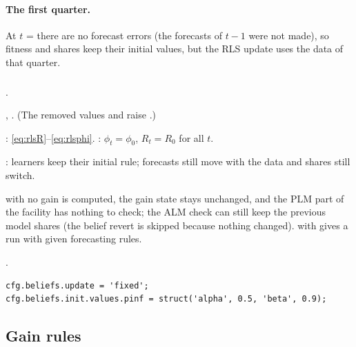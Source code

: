 \documentclass[11pt,a4paper]{article}
\DeclareRobustCommand{\codem}[1]{\texttt{\detokenize{#1}}}
\newenvironment{optspec}%
  {\begin{description}[style=sameline,leftmargin=2.7cm,labelwidth=2.5cm,font=\normalfont\itshape]}%
  {\end{description}}
\begin{document}
\paragraph{The first quarter.} At $t$ =  there are no forecast errors
(the forecasts of $t-1$ were not made), so fitness and shares keep their initial values, but the
RLS update uses the data of that quarter.

\subsubsection{\texorpdfstring{\codem{beliefs.update}}{beliefs.update}}\label{opt:beliefs-update}
\begin{optspec}
  \item[Default] .
  \item[Values] , . (The removed values  and 
        raise .)
  \item[Math] : \eqref{eq:rlsR}--\eqref{eq:rlsphi}. :
        $\phi_t = \phi_0$, $R_t = R_0$ for all $t$.
  \item[Assumptions] : learners keep their initial rule; forecasts still move with
        the data and shares still switch.
  \item[Interactions] with  no gain is computed, the gain state stays unchanged, and the
        PLM part of the facility has nothing to check; the ALM check can still keep the
        previous model shares (the belief revert is skipped because nothing changed).
         with  gives a run with given
        forecasting rules.
  \item[Code] .
  \item[Example]
\begin{lstlisting}
cfg.beliefs.update = 'fixed';
cfg.beliefs.init.values.pinf = struct('alpha', 0.5, 'beta', 0.9);
\end{lstlisting}
\end{optspec}

\subsection{Gain rules}\label{sec:gain}
\end{document}
